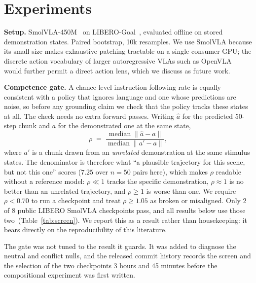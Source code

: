 \documentclass{article}
\begin{document}
\section{Experiments}
\label{sec:exp}

\textbf{Setup.} SmolVLA-450M~\citep{smolvla} on LIBERO-Goal~\citep{libero}, evaluated
offline on stored demonstration states. Paired bootstrap, 10k resamples. We use SmolVLA
because its small size makes exhaustive patching tractable on a single consumer GPU; the
discrete action vocabulary of larger autoregressive VLAs such as
OpenVLA~\citep{openvla} would further permit a direct action lens, which we discuss as future work.

\textbf{Competence gate.} A chance-level instruction-following rate is equally consistent
with a policy that ignores language and one whose predictions are noise, so before any grounding
claim we check that the policy tracks these states at all. The check needs no extra forward
passes. Writing $\hat{a}$ for the predicted 50-step chunk and $a$ for the demonstrated one at the
same state,
\[
\rho \;=\;
\frac{\operatorname{median}\lVert \hat{a}-a\rVert}{\operatorname{median}\lVert a'-a\rVert},
\]
where $a'$ is a chunk drawn from an \emph{unrelated} demonstration at the same stimulus states.
The denominator is therefore what ``a plausible trajectory for this scene, but not this one''
scores ($7.25$ over $n=50$ pairs here), which makes $\rho$ readable without a reference model:
$\rho \ll 1$ tracks the specific demonstration, $\rho \approx 1$ is no better than an unrelated
trajectory, and $\rho \geq 1$ is worse than one. We require $\rho < 0.70$ to run a checkpoint and
treat $\rho \geq 1.05$ as broken or misaligned. Only 2 of 8 public LIBERO SmolVLA checkpoints
pass, and all results below use those two\iflong~(Table~\ref{tab:screen})\fi. We report this as a result
rather than housekeeping: it bears directly on the reproducibility of this literature.

The gate was not tuned to the result it guards. It was added to diagnose the neutral and
conflict nulls, and the released commit history records the screen and the selection of the two
checkpoints 3 hours and 45 minutes before the compositional experiment was first written.
\end{document}
